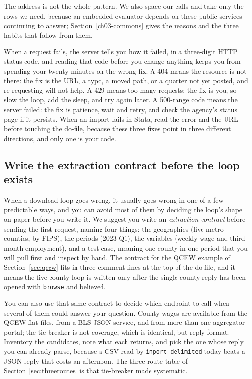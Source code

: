 The address is not the whole pattern. We also space our calls and take only the rows we need, because an embedded evaluator depends on these public services continuing to answer; Section~\ref{ch03-commons} gives the reasons and the three habits that follow from them.

When a request fails, the server tells you how it failed, in a three-digit HTTP status code, and reading that code before you change anything keeps you from spending your twenty minutes on the wrong fix. A 404 means the resource is not there: the fix is the URL, a typo, a moved path, or a quarter not yet posted, and re-requesting will not help. A 429 means too many requests: the fix is you, so slow the loop, add the sleep, and try again later. A 500-range code means the server failed: the fix is patience, wait and retry, and check the agency's status page if it persists. When an import fails in Stata, read the error and the URL before touching the do-file, because these three fixes point in three different directions, and only one is your code.

\subsection{Write the extraction contract before the loop exists}\label{ch03-sc-contract}
When a download loop goes wrong, it usually goes wrong in one of a few predictable ways, and you can avoid most of them by deciding the loop's shape on paper before you write it. We suggest you write an \emph{extraction contract} before sending the first request, naming four things: the geographies (five metro counties, by FIPS), the periods (2023 Q1), the variables (weekly wage and third-month employment), and a test case, meaning one county in one period that you will pull first and inspect by hand. The contract for the QCEW example of Section~\ref{sec:qcew} fits in three comment lines at the top of the do-file, and it means the five-county loop is written only after the single-county reply has been opened with \texttt{browse} and believed.

You can also use that same contract to decide which endpoint to call when several of them could answer your question. County wages are available from the QCEW flat files, from a BLS JSON service, and from more than one aggregator portal; the tie-breaker is not coverage, which is identical, but reply format. Inventory the candidates, note what each returns, and pick the one whose reply you can already parse, because a CSV read by \texttt{import delimited} today beats a JSON reply that costs an afternoon. The three-route table of Section~\ref{sec:threeroutes} is that tie-breaker made systematic.

